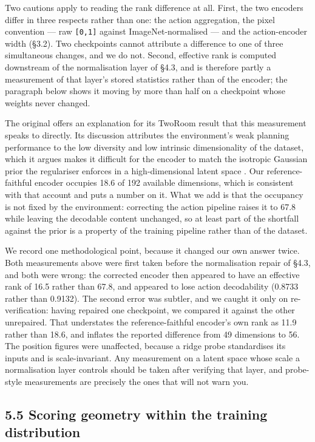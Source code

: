 \documentclass[10pt]{article}
\begin{document}
Two cautions apply to reading the rank difference at all. First, the two
encoders differ in three respects rather than one: the action aggregation, the
pixel convention --- raw \texttt{{[}0,1{]}} against ImageNet-normalised --- and the
action-encoder width (\S{}3.2). Two checkpoints cannot attribute a difference to
one of three simultaneous changes, and we do not. Second, effective rank is
computed downstream of the normalisation layer of \S{}4.3, and is therefore partly
a measurement of that layer's stored statistics rather than of the encoder; the
paragraph below shows it moving by more than half on a checkpoint whose weights
never changed.

The original offers an explanation for its TwoRoom result that this measurement
speaks to directly. Its discussion attributes the environment's weak planning
performance to the low diversity and low intrinsic dimensionality of the
dataset, which it argues makes it difficult for the encoder to match the
isotropic Gaussian prior the regulariser enforces in a high-dimensional latent space \citep[\S4.2]{maes2026lewm}. Our reference-faithful encoder occupies 18.6 of 192 available
dimensions, which is consistent with that account and puts a number on it. What
we add is that the occupancy is not fixed by the environment: correcting the
action pipeline raises it to 67.8 while leaving the decodable content unchanged,
so at least part of the shortfall against the prior is a property of the
training pipeline rather than of the dataset.

We record one methodological point, because it changed our own answer twice.
Both measurements above were first taken before the normalisation repair of
\S{}4.3, and both were wrong: the corrected encoder then appeared to have an
effective rank of 16.5 rather than 67.8, and appeared to lose action
decodability (0.8733 rather than 0.9132). The second error was subtler, and we
caught it only on re-verification: having repaired one checkpoint, we compared
it against the other unrepaired. That understates the reference-faithful
encoder's own rank as 11.9 rather than 18.6, and inflates the reported
difference from 49 dimensions to 56. The position figures were unaffected,
because a ridge probe
standardises its inputs and is scale-invariant. Any measurement on a latent space
whose scale a normalisation layer controls should be taken after verifying that
layer, and probe-style measurements are precisely the ones that will not warn
you.

\subsection{5.5 Scoring geometry within the training distribution}\label{scoring-geometry-within-the-training-distribution}
\end{document}
